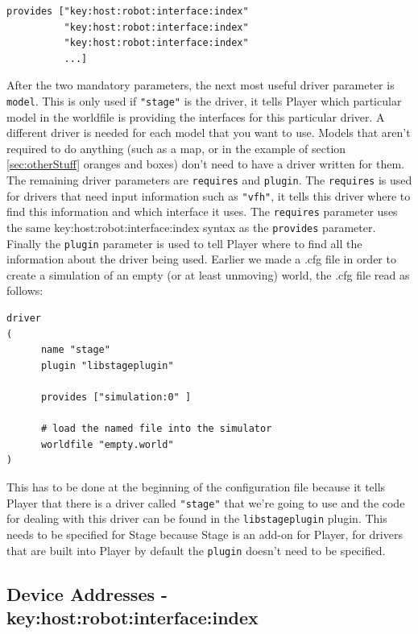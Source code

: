 \documentclass[a4paper]{article}
\newcommand{\pl}{Player\xspace}
\begin{document}
\begin{verbatim}
provides ["key:host:robot:interface:index" 
          "key:host:robot:interface:index"
          "key:host:robot:interface:index"
          ...]
\end{verbatim}

After the two mandatory parameters, the next most useful driver parameter is \verb|model|. This is only used if \verb|"stage"| is the driver, it tells \pl which particular model in the worldfile is providing the interfaces for this particular driver. A different driver is needed for each model that you want to use. Models that aren't required to do anything (such as a map, or in the example of section \ref{sec:otherStuff} oranges and boxes) don't need to have a driver written for them.\newline
The remaining driver parameters are \verb|requires| and \verb|plugin|. The \verb|requires| is used for drivers that need input information such as \verb|"vfh"|, it tells this driver where to find this information and which interface it uses. The \verb|requires| parameter uses the same key:host:robot:interface:index syntax as the \verb|provides| parameter. Finally the \verb|plugin| parameter is used to tell \pl where to find all the information about the driver being used. Earlier we made a .cfg file in order to create a simulation of an empty (or at least unmoving) world, the .cfg file read as follows:
\begin{verbatim}
driver
(		
      name "stage"
      plugin "libstageplugin"

      provides ["simulation:0" ]

      # load the named file into the simulator
      worldfile "empty.world"	
)
\end{verbatim}
This has to be done at the beginning of the configuration file because it tells \pl that there is a driver called \verb|"stage"| that we're going to use and the code for dealing with this driver can be found in the \verb|libstageplugin| plugin. This needs to be specified for Stage because Stage is an add-on for \pl, for drivers that are built into \pl by default the \verb|plugin| doesn't need to be specified.

\subsection{Device Addresses - key:host:robot:interface:index} \label{sec:deviceAddress}
\end{document}
